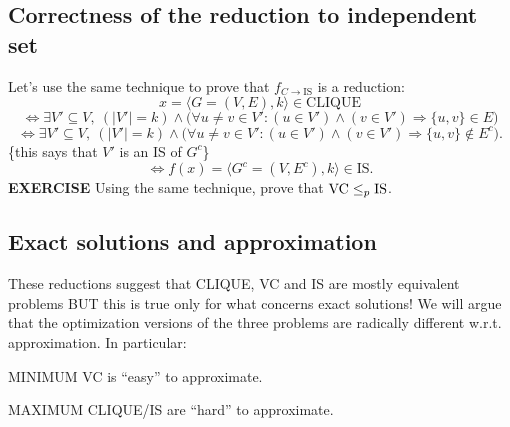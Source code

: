 \subsection{Correctness of the reduction to independent set}
Let's use the same technique to prove that $f_{C\to\mathrm{IS}}$ is a reduction:
\[x=\langle G=(V,E),k\rangle\in\mathrm{CLIQUE}\]
\[
\Longleftrightarrow\exists V'\subseteq V,\ (|V'|=k)\land
\bigl(\forall u\neq v\in V':(u\in V')\land(v\in V')\Rightarrow\{u,v\}\in E\bigr)
\]
\[
\Longleftrightarrow\exists V'\subseteq V,\ (|V'|=k)\land
\bigl(\forall u\neq v\in V':(u\in V')\land(v\in V')\Rightarrow\{u,v\}\notin E^c\bigr).
\]
\{this says that $V'$ is an IS of $G^c$\}
\[\Longleftrightarrow f(x)=\langle G^c=(V,E^c),k\rangle\in\mathrm{IS}.\]
\textbf{EXERCISE} Using the same technique, prove that $\mathrm{VC}\leq_p\mathrm{IS}$.

\subsection{Exact solutions and approximation}
These reductions suggest that CLIQUE, VC and IS are mostly equivalent problems BUT this is true only for what concerns exact solutions! We will argue that the optimization versions of the three problems are radically different w.r.t. approximation. In particular:

MINIMUM VC is ``easy'' to approximate.

MAXIMUM CLIQUE/IS are ``hard'' to approximate.
